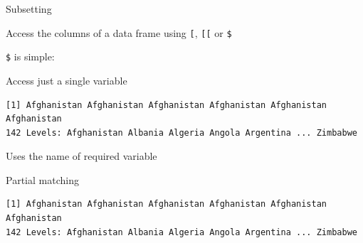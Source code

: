 \documentclass[10pt,ignorenonframetext,compress, aspectratio=169]{beamer}
\newenvironment{Shaded}{\begin{snugshade}}{\end{snugshade}}
\newcommand{\KeywordTok}[1]{\textcolor[rgb]{0.13,0.29,0.53}{\textbf{{#1}}}}
\newcommand{\NormalTok}[1]{{#1}}
\begin{document}
\begin{frame}[fragile]{Subsetting}

Access the columns of a data frame using \texttt{{[}}, \texttt{{[}{[}}
or \texttt{\$}

\texttt{\$} is simple:

Access just a single variable

\scriptsize

\begin{Shaded}
\end{Shaded}

\begin{verbatim}
[1] Afghanistan Afghanistan Afghanistan Afghanistan Afghanistan Afghanistan
142 Levels: Afghanistan Albania Algeria Angola Argentina ... Zimbabwe
\end{verbatim}

\normalsize

Uses the name of required variable

Partial matching

\scriptsize

\begin{Shaded}
\end{Shaded}

\begin{verbatim}
[1] Afghanistan Afghanistan Afghanistan Afghanistan Afghanistan Afghanistan
142 Levels: Afghanistan Albania Algeria Angola Argentina ... Zimbabwe
\end{verbatim}

\normalsize

\end{frame}
\end{document}
